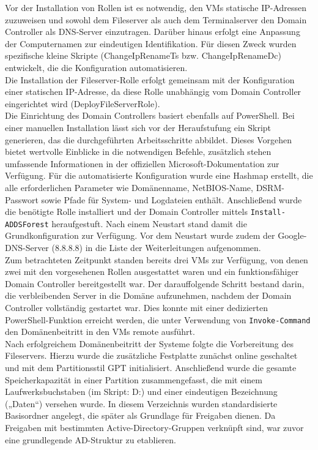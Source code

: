 \documentclass[a4paper,12pt]{article}
\begin{document}
Vor der Installation von Rollen ist es notwendig, den VMs statische IP-Adressen zuzuweisen und sowohl dem Fileserver als auch dem Terminalserver den Domain Controller als DNS-Server einzutragen. 
Darüber hinaus erfolgt eine Anpassung der Computernamen zur eindeutigen Identifikation. 
Für diesen Zweck wurden spezifische kleine Skripte (ChangeIpRenameTs bzw. ChangeIpRenameDc) entwickelt, die die Konfiguration automatisieren.\\
Die Installation der Fileserver-Rolle erfolgt gemeinsam mit der Konfiguration einer statischen IP-Adresse, da diese Rolle unabhängig vom Domain Controller eingerichtet wird (DeployFileServerRole).\\

Die Einrichtung des Domain Controllers basiert ebenfalls auf PowerShell. 
Bei einer manuellen Installation lässt sich vor der Heraufstufung ein Skript generieren, das die durchgeführten Arbeitsschritte abbildet. 
Dieses Vorgehen bietet wertvolle Einblicke in die notwendigen Befehle, zusätzlich stehen umfassende Informationen in der offiziellen Microsoft-Dokumentation zur Verfügung. 
Für die automatisierte Konfiguration wurde eine Hashmap erstellt, die alle erforderlichen Parameter wie Domänenname, NetBIOS-Name, DSRM-Passwort sowie Pfade für System- und Logdateien enthält. 
Anschlie\ss end wurde die benötigte Rolle installiert und der Domain Controller mittels \lstinline|Install-ADDSForest| heraufgestuft. 
Nach einem Neustart stand damit die Grundkonfiguration zur Verfügung. Vor dem Neustart wurde zudem der Google-DNS-Server (8.8.8.8) in die Liste der Weiterleitungen aufgenommen.\\

Zum betrachteten Zeitpunkt standen bereits drei VMs zur Verfügung, von denen zwei mit den vorgesehenen Rollen ausgestattet waren und ein funktionsfähiger Domain Controller bereitgestellt war. 
Der darauffolgende Schritt bestand darin, die verbleibenden Server in die Domäne aufzunehmen, nachdem der Domain Controller vollständig gestartet war. 
Dies konnte mit einer dedizierten PowerShell-Funktion erreicht werden, die unter Verwendung von \lstinline|Invoke-Command| den Domänenbeitritt in den VMs remote ausführt.\\

Nach erfolgreichem Domänenbeitritt der Systeme folgte die Vorbereitung des Fileservers. 
Hierzu wurde die zusätzliche Festplatte zunächst online geschaltet und mit dem Partitionsstil GPT initialisiert. 
Anschlie\ss end wurde die gesamte Speicherkapazität in einer Partition zusammengefasst, die mit einem Laufwerksbuchstaben (im Skript: D:) und einer eindeutigen Bezeichnung („Daten“) versehen wurde. 
In diesem Verzeichnis wurden standardisierte Basisordner angelegt, die später als Grundlage für Freigaben dienen. 
Da Freigaben mit bestimmten Active-Directory-Gruppen verknüpft sind, war zuvor eine grundlegende AD-Struktur zu etablieren.\\
\end{document}
